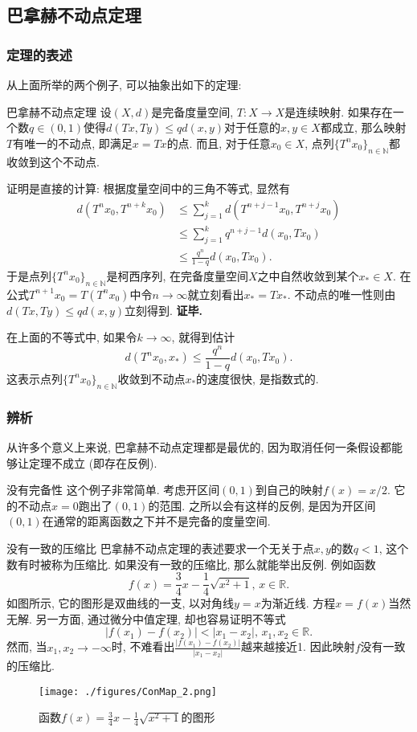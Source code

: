 \subsection{巴拿赫不动点定理}
\subsubsection{定理的表述}
从上面所举的两个例子, 可以抽象出如下的定理:
\begin{theorem}{巴拿赫不动点定理}
设$(X,d)$是完备度量空间, $T:X\to X$是连续映射. 如果存在一个数$q\in(0,1)$使得$d(Tx,Ty)\leq qd(x,y)$对于任意的$x,y\in X$都成立, 那么映射$T$有唯一的不动点, 即满足$x=Tx$的点. 而且, 对于任意$x_0\in X$, 点列$\{T^nx_0\}_{n\in\mathbb{N}}$都收敛到这个不动点.
\end{theorem}
证明是直接的计算: 根据度量空间中的三角不等式, 显然有
$$
\begin{aligned}
d(T^nx_0,T^{n+k}x_0)
&\leq \sum_{j=1}^k d(T^{n+j-1}x_0,T^{n+j}x_0)\\
&\leq \sum_{j=1}^k q^{n+j-1}d(x_0,Tx_0)\\
&\leq \frac{q^n}{1-q}d(x_0,Tx_0).
\end{aligned}
$$
于是点列$\{T^nx_0\}_{n\in\mathbb{N}}$是柯西序列, 在完备度量空间$X$之中自然收敛到某个$x_*\in X$. 在公式$T^{n+1}x_0=T(T^nx_0)$中令$n\to\infty$就立刻看出$x_*=Tx_*$. 不动点的唯一性则由$d(Tx,Ty)\leq qd(x,y)$立刻得到. \textbf{证毕.}

在上面的不等式中, 如果令$k\to\infty$, 就得到估计
$$
d(T^nx_0,x_*)\leq\frac{q^n}{1-q}d(x_0,Tx_0).
$$
这表示点列$\{T^nx_0\}_{n\in\mathbb{N}}$收敛到不动点$x_*$的速度很快, 是指数式的.

\subsubsection{辨析}
从许多个意义上来说, 巴拿赫不动点定理都是最优的, 因为取消任何一条假设都能够让定理不成立 (即存在反例).

\begin{example}{没有完备性}
这个例子非常简单. 考虑开区间$(0,1)$到自己的映射$f(x)=x/2$. 它的不动点$x=0$跑出了$(0,1)$的范围. 之所以会有这样的反例, 是因为开区间$(0,1)$在通常的距离函数之下并不是完备的度量空间.
\end{example}

\begin{example}{没有一致的压缩比}
巴拿赫不动点定理的表述要求一个无关于点$x,y$的数$q<1$, 这个数有时被称为压缩比. 如果没有一致的压缩比, 那么就能举出反例. 例如函数
$$
f(x)=\frac{3}{4}x-\frac{1}{4}\sqrt{x^2+1},\,x\in\mathbb{R}.
$$
如图所示, 它的图形是双曲线的一支, 以对角线$y=x$为渐近线. 方程$x=f(x)$当然无解. 另一方面, 通过微分中值定理, 却也容易证明不等式
$$
|f(x_1)-f(x_2)|<|x_1-x_2|,\,x_1,x_2\in\mathbb{R}.
$$
然而, 当$x_1,x_2\to-\infty$时, 不难看出$\frac{|f(x_1)-f(x_2)|}{|x_1-x_2|}$越来越接近1. 因此映射$f$没有一致的压缩比. 
\begin{figure}[ht]
\centering
\texttt{[image: ./figures/ConMap\_2.png]}
\caption{函数$f(x)=\frac{3}{4}x-\frac{1}{4}\sqrt{x^2+1}$的图形} \label{ConMap_fig2}
\end{figure}

\end{example}

